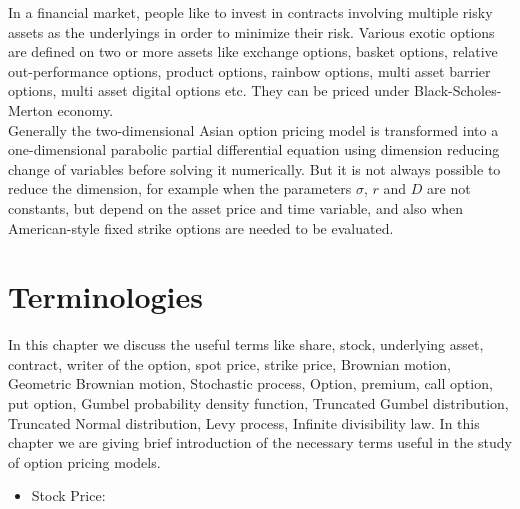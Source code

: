\documentclass[12pt, a4paper]{report}
\begin{document}
In a financial market, people like to invest in contracts involving multiple risky assets as the underlyings in order to minimize their risk. Various exotic options are defined on two or more assets like exchange options, basket options, relative out-performance options, product options, rainbow options, multi asset barrier options, multi asset digital options etc. They can be priced under Black-Scholes-Merton economy.\\

Generally the two-dimensional Asian option pricing model is transformed into a one-dimensional parabolic partial differential equation using dimension reducing change of variables before solving it numerically. But it is not always possible to reduce the dimension, for example when the parameters $\sigma$, $r$ and $D$ are not constants, but depend on the asset price and time variable, and also when American-style fixed strike options are needed to be evaluated.

\section{Terminologies}
In this chapter we discuss the useful terms like share, stock, underlying asset,
contract, writer of the option, spot price, strike price, Brownian motion, Geometric Brownian
motion, Stochastic process, Option, premium, call option, put option, Gumbel probability
density function, Truncated Gumbel distribution, Truncated Normal distribution, Levy
process, Infinite divisibility law. In this chapter we are giving brief introduction of the
necessary terms useful in the study of option pricing models.
\begin{itemize}
    \item Stock Price:
    
\end{itemize}












 \clearpage
\end{document}

